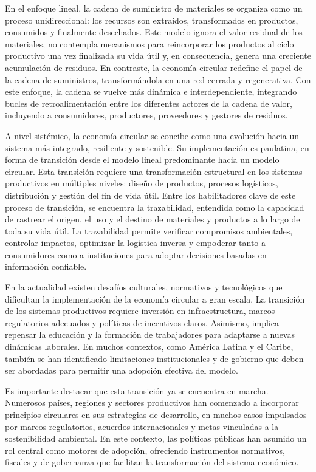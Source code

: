 En el enfoque lineal, la cadena de suministro de materiales se organiza como un proceso unidireccional: los recursos son extraídos, transformados en productos, consumidos y finalmente desechados. Este modelo ignora el valor residual de los materiales, no contempla mecanismos para reincorporar los productos al ciclo productivo una vez finalizada su vida útil y, en consecuencia, genera una creciente acumulación de residuos. En contraste, la economía circular redefine el papel de la cadena de suministros, transformándola en una red cerrada y regenerativa. Con este enfoque, la cadena se vuelve más dinámica e interdependiente, integrando bucles de retroalimentación entre los diferentes actores de la cadena de valor, incluyendo a consumidores, productores, proveedores y gestores de residuos. 

A nivel sistémico, la economía circular se concibe como una evolución hacia un sistema más integrado, resiliente y sostenible. Su implementación es paulatina, en forma de transición desde el modelo lineal predominante hacia un modelo circular. Esta transición requiere una transformación estructural en los sistemas productivos en múltiples niveles: diseño de productos, procesos logísticos, distribución y gestión del fin de vida útil. Entre los habilitadores clave de este proceso de transición, se encuentra la trazabilidad, entendida como la capacidad de rastrear el origen, el uso y el destino de materiales y productos a lo largo de toda su vida útil. La trazabilidad permite verificar compromisos ambientales, controlar impactos, optimizar la logística inversa y empoderar tanto a consumidores como a instituciones para adoptar decisiones basadas en información confiable.

En la actualidad existen desafíos culturales, normativos y tecnológicos que dificultan la implementación de la economía circular a gran escala. La transición de los sistemas productivos requiere inversión en infraestructura, marcos regulatorios adecuados y políticas de incentivos claros. Asimismo, implica repensar la educación y la formación de trabajadores para adaptarse a nuevas dinámicas laborales. En muchos contextos, como América Latina y el Caribe, también se han identificado limitaciones institucionales y de gobierno que deben ser abordadas para permitir una adopción efectiva del modelo.

Es importante destacar que esta transición ya se encuentra en marcha. Numerosos países, regiones y sectores productivos han comenzado a incorporar principios circulares en sus estrategias de desarrollo, en muchos casos impulsados por marcos regulatorios, acuerdos internacionales y metas vinculadas a la sostenibilidad ambiental. En este contexto, las políticas públicas han asumido un rol central como motores de adopción, ofreciendo instrumentos normativos, fiscales y de gobernanza que facilitan la transformación del sistema económico. %

